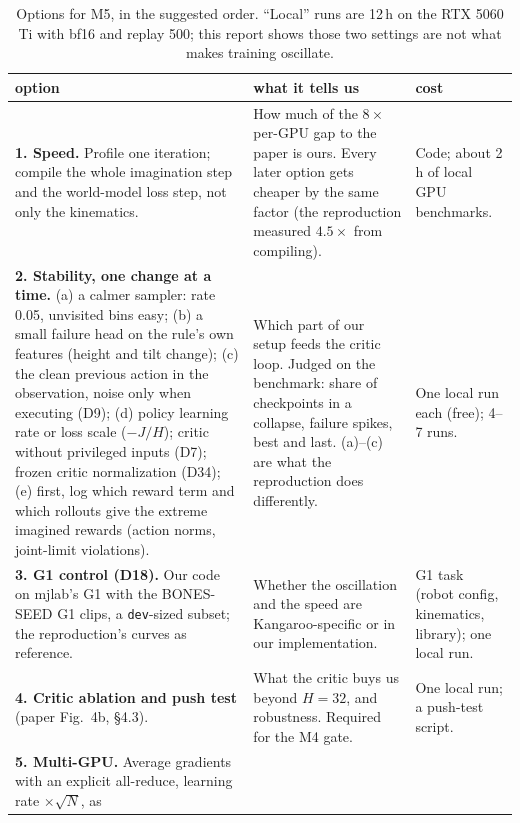 \documentclass[10pt]{article}
\begin{document}
\begin{table}[H]
\centering\small
\caption{Options for M5, in the suggested order. ``Local'' runs are 12\,h on the RTX 5060 Ti with bf16
and replay 500; this report shows those two settings are not what makes training oscillate.}
\label{tab:options}
\renewcommand{\arraystretch}{1.15}
\begin{tabularx}{\textwidth}{@{}LL>{\raggedright\arraybackslash}p{2.7cm}@{}}\toprule
option & what it tells us & cost \\\midrule
\textbf{1. Speed.} Profile one iteration; compile the whole imagination step and the world-model loss
step, not only the kinematics. &
How much of the $8\times$ per-GPU gap to the paper is ours. Every later option gets cheaper by the same
factor (the reproduction measured $4.5\times$ from compiling). &
Code; about 2\,h of local GPU benchmarks. \\
\textbf{2. Stability, one change at a time.}\newline
(a) a calmer sampler: rate 0.05, unvisited bins easy;\newline
(b) a small failure head on the rule's own features (height and tilt change);\newline
(c) the clean previous action in the observation, noise only when executing (D9);\newline
(d) policy learning rate or loss scale ($-J/H$); critic without privileged inputs (D7); frozen critic
normalization (D34);\newline
(e) first, log which reward term and which rollouts give the extreme imagined rewards (action norms,
joint-limit violations). &
Which part of our setup feeds the critic loop. Judged on the benchmark: share of checkpoints in a
collapse, failure spikes, best and last. (a)--(c) are what the reproduction does differently. &
One local run each (free); 4--7 runs. \\
\textbf{3. G1 control (D18).} Our code on mjlab's G1 with the BONES-SEED G1 clips, a
\texttt{dev}-sized subset; the reproduction's curves as reference. &
Whether the oscillation and the speed are Kangaroo-specific or in our implementation. &
G1 task (robot config, kinematics, library); one local run. \\
\textbf{4. Critic ablation and push test} (paper Fig.~4b, \S4.3). &
What the critic buys us beyond $H = 32$, and robustness. Required for the M4 gate. &
One local run; a push-test script. \\
\textbf{5. Multi-GPU.} Average gradients with an explicit all-reduce, learning rate $\times\sqrt{N}$, as

\end{tabularx}
\end{table}
\end{document}
